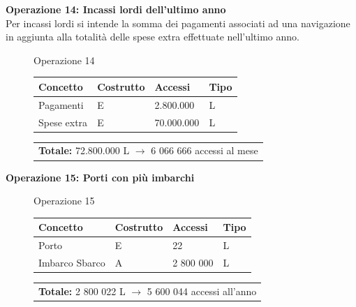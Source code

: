 \documentclass[a4paper, titlepage]{report}
\begin{document}
	\vspace{0.5cm}
	
	\noindent
	\textbf{{\large {Operazione 14: }}}\textbf{Incassi lordi dell'ultimo anno} \\
    Per incassi lordi si intende la somma dei pagamenti associati ad una navigazione in aggiunta alla totalità delle spese extra effettuate nell'ultimo anno.
	
	\begin{figure}[h]
		\centering
		Operazione 14\\
		\begin{tabular}{L{3cm}C{2.5cm}C{4.5cm}C{2.5cm}}
			\rule[-2mm]{0mm}{0.65cm}{}
			\textbf{Concetto} & \textbf{Costrutto} &\textbf{Accessi} & \textbf{Tipo} \\
			\hline\rule[-2mm]{0mm}{0.65cm}{}
			Pagamenti & E & 2.800.000 & L \\
			\hline\rule[-2mm]{0mm}{0.65cm}{}
			Spese extra & E & 70.000.000 & L \\
		\end{tabular}
		\begin{tabular}{C{13.9cm}}
			\rule[-4mm]{0mm}{1cm}{}	
			 \textbf{Totale:} 72.800.000 L $\to$ 6 066 666 accessi al mese
		\end{tabular}
	\end{figure}

	\vspace{0.5cm}
	
	\newpage
	
	\noindent
	\textbf{{\large {Operazione 15: }}}\textbf{Porti con più imbarchi}
	\begin{figure}[h!]
		\centering
		Operazione 15 \\
		\begin{tabular}{L{3cm}C{2.5cm}C{4.5cm}C{2.5cm}}
			\rule[-2mm]{0mm}{0.65cm}{}
			\textbf{Concetto} & \textbf{Costrutto} &\textbf{Accessi} & \textbf{Tipo} \\
			\hline\rule[-2mm]{0mm}{0.65cm}{}
			Porto & E & 22 & L \\
			\hline\rule[-2mm]{0mm}{0.65cm}{}
			Imbarco Sbarco & A & 2 800 000 & L \\
		\end{tabular}
		\begin{tabular}{C{13.9cm}}
			\rule[-4mm]{0mm}{1cm}{}	
			 \textbf{Totale:} 2 800 022 L $\to$ 5 600 044 accessi all'anno
		\end{tabular}
	\end{figure}
\end{document}
